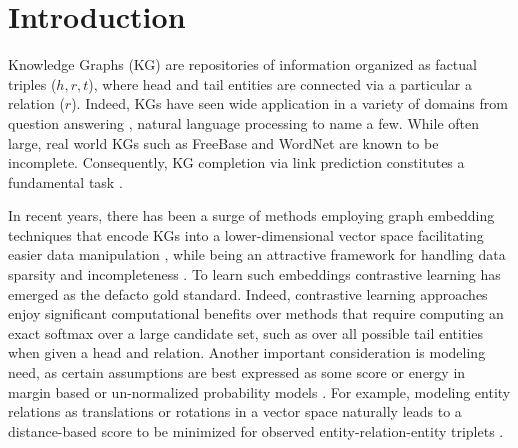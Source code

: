 \section{Introduction}

Knowledge Graphs (KG) are repositories of information organized as factual triples ($h,r,t$), where head and tail entities are connected via a particular a relation ($r$). Indeed, KGs have seen wide application in a variety of domains from question answering \cite{yao2014information, malinowski2014multi, hao2017end}, natural language processing \cite{berant2013semantic, yu2014improving, yang2019leveraging} to name a few. While often large, real world KGs such as FreeBase \cite{bollacker2008freebase} and WordNet \cite{miller1995wordnet} are known to be incomplete. Consequently, KG completion via link prediction constitutes a fundamental task \cite{sun2019rotate, kotnis2017analysis, angeli2013philosophers}.

In recent years, there has been a surge of methods employing graph embedding techniques that encode KGs into a lower-dimensional vector space facilitating easier data manipulation \cite{zhang2019nscaching}, while being an attractive framework for handling data sparsity and incompleteness \cite{wang2018incorporating}. To learn such embeddings contrastive learning has emerged as the defacto gold standard. Indeed, contrastive learning approaches enjoy significant computational benefits over methods that require computing an exact softmax over a large candidate set, such as over all possible tail entities when given a head and relation. Another important consideration is modeling need, as certain assumptions are best expressed as some score or energy in margin based or un-normalized probability models \cite{smith2005contrastive}. For example, modeling entity relations as translations or rotations in a vector space naturally leads to a distance-based score to be minimized for observed entity-relation-entity triplets \cite{bordes2013translating}.

